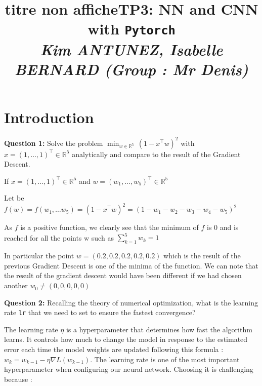 \documentclass[10pt,a4paper]{article}
\title{titre non affiche}
\author{}
\date{}
\title{\textbf{TP3: NN and CNN with \texttt{Pytorch}} \medskip \\ \large \emph{Kim ANTUNEZ, Isabelle BERNARD (Group : Mr Denis)}}
\author{}
\theoremstyle{break}
\begin{document}
\maketitle


\vspace{-20truemm}

\hypertarget{introduction}{%
\section{Introduction}\label{introduction}}

\begin{tcolorbox}

\textbf{Question 1:} Solve the problem \(\min_{w \in \mathbb{R}^5}\, (1 - x^\top w)^2\) with \(x = (1, \ldots, 1)^\top \in \mathbb{R}^5\) analytically and compare to the result of the Gradient Descent.

\end{tcolorbox}

If \(x = (1, \ldots, 1)^\top \in \mathbb{R}^5\) and \(w = (w_1, \ldots, w_5)^\top \in \mathbb{R}^5\)

Let be \(f(w) = f(w_1, \dots w_5) = (1 - x^\top w)^2 = (1 - w_1 - w_2 - w_3 - w_4 - w_5)^2\)

As \(f\) is a positive function, we clearly see that the minimum of \(f\) is 0 and is reached for all the points w such as \(\sum_{k=1}^5 w_k = 1\)

In particular the point \(w=(0.2, 0.2, 0.2, 0.2, 0.2)\) which is the result of the previous Gradient Descent is one of the minima of the function. We can note that the result of the gradient descent would have been different if we had chosen another \(w_0 \ne (0, 0, 0, 0, 0)\)

\begin{tcolorbox}

\textbf{Question 2:} Recalling the theory of numerical optimization, what is the learning rate \texttt{lr} that we need to set to ensure the fastest convergence?

\end{tcolorbox}

The learning rate \(\eta\) is a hyperparameter that determines how fast the algorithm learns. It controls how much to change the model in response to the estimated error each time the model weights are updated following this formula : \(w_k = w_{k - 1} - \eta \nabla L(w_{k - 1})\). The learning rate is one of the most important hyperparameter when configuring our neural network. Choosing it is challenging because :
\end{document}
